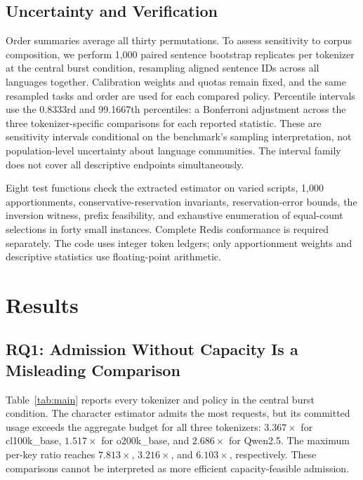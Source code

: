 \documentclass[manuscript,screen]{acmart}
\begin{document}
\subsection{Uncertainty and Verification}
Order summaries average all thirty permutations. To assess sensitivity to corpus composition, we perform 1,000 paired sentence bootstrap replicates per tokenizer at the central burst condition, resampling aligned sentence IDs across all languages together. Calibration weights and quotas remain fixed, and the same resampled tasks and order are used for each compared policy. Percentile intervals use the 0.8333rd and 99.1667th percentiles: a Bonferroni adjustment across the three tokenizer-specific comparisons for each reported statistic. These are sensitivity intervals conditional on the benchmark's sampling interpretation, not population-level uncertainty about language communities. The interval family does not cover all descriptive endpoints simultaneously.

Eight test functions check the extracted estimator on varied scripts, 1,000 apportionments, conservative-reservation invariants, reservation-error bounds, the inversion witness, prefix feasibility, and exhaustive enumeration of equal-count selections in forty small instances. Complete Redis conformance is required separately. The code uses integer token ledgers; only apportionment weights and descriptive statistics use floating-point arithmetic.

\section{Results}
\subsection{RQ1: Admission Without Capacity Is a Misleading Comparison}
Table~\ref{tab:main} reports every tokenizer and policy in the central burst condition. The character estimator admits the most requests, but its committed usage exceeds the aggregate budget for all three tokenizers: $3.367\times$ for cl100k\_base, $1.517\times$ for o200k\_base, and $2.686\times$ for Qwen2.5. The maximum per-key ratio reaches $7.813\times$, $3.216\times$, and $6.103\times$, respectively. These comparisons cannot be interpreted as more efficient capacity-feasible admission.

\begin{table}[t]
\centering\small
\caption{Central condition: equal translated demand, $f=0.5$, full burst, thirty task orders. ``Usage'' is exact committed input-token demand. Exact, Bytes, and Calibrated respect each key's quota; Chars/4 does not. Gap is maximum minus minimum language coverage in percentage points. Calibrated changes entitlements while preserving the total quota.}
\label{tab:main}
\end{table}
\end{document}
